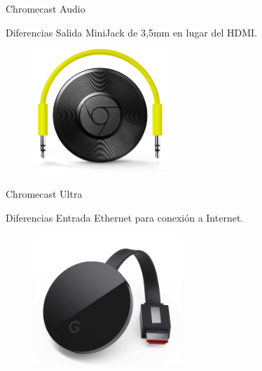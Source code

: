 \begin{frame}{Chromecast Audio}
	\begin{block}{Diferencias}
		Salida MiniJack de 3,5mm en lugar del HDMI.
	\end{block}
	
	\begin{figure}[h]
		\centering
		\includegraphics[width=0.45\textwidth]{./Imagenes/chromecastaudio.png}
	\end{figure}
\end{frame}


\begin{frame}{Chromecast Ultra}
	\begin{block}{Diferencias}
		Entrada Ethernet para conexión a Internet.
	\end{block}
	
	\begin{figure}[h]
		\centering
		\includegraphics[width=0.5\textwidth]{./Imagenes/chromecast-ultra.jpg}
	\end{figure}
\end{frame}